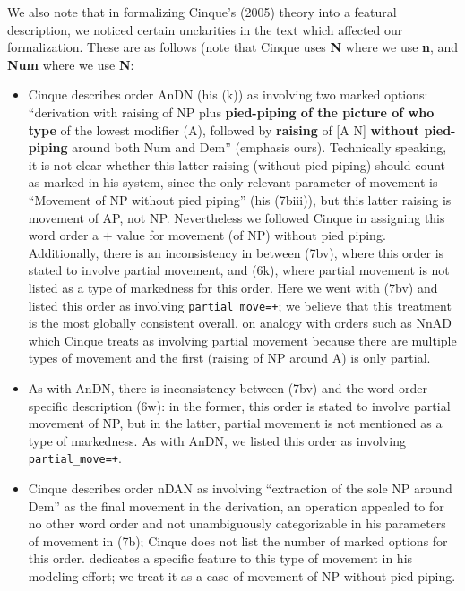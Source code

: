 \documentclass[11pt]{article}
\begin{document}
We also note that in formalizing Cinque's (2005) theory into a
featural description, we noticed certain unclarities in the text which
affected our formalization.  These are as follows (note that Cinque
uses \textbf{N} where we use \textbf{n}, and \textbf{Num} where we use
\textbf{N}:
%
\begin{itemize}
\item  Cinque describes order AnDN (his (k)) as involving two marked
  options: ``derivation with raising of NP plus \textbf{pied-piping of
    the picture of who type} of the lowest modifier (A), followed by
  \textbf{raising} of [A N] \textbf{without pied-piping} around both
  Num and Dem'' (emphasis ours).  Technically speaking, it is not
  clear whether this latter raising (without pied-piping) should count as marked
  in his system, since the only relevant parameter of movement 
   is ``Movement of NP without pied piping'' (his (7biii)), but this
   latter raising is movement of AP, not NP.  Nevertheless we followed
   Cinque in assigning this word order a $+$ value for movement
   (of NP) without pied piping.  Additionally, there is an
   inconsistency in \citet{cinque2005deriving} between (7bv), where
   this order is stated to involve partial movement, and (6k), where
   partial movement is not listed as a type of markedness for this
   order. Here we went with (7bv) and listed this order as involving
   \verb-partial_move=+-; we believe that this treatment is the most
   globally consistent overall, on analogy with orders such as NnAD
   which Cinque treats as involving partial movement because there are
   multiple types of movement and the first (raising of NP around A)
   is only partial.
 \item As with AnDN, there is inconsistency between (7bv) and the
   word-order-specific description (6w): in the  former, this order is
   stated to involve partial movement of NP, but in the latter,
   partial movement is not mentioned as a type of markedness.  As with AnDN,
   we listed this order as involving \verb-partial_move=+-.   %
 \item Cinque describes order nDAN as involving ``extraction of the
   sole NP around Dem'' as the final movement in the derivation, an
   operation appealed to for no other word order and not unambiguously
   categorizable in his parameters of movement in (7b); Cinque does
   not list the number of marked options for this order.
   \citet{cysouw2010towards} dedicates a specific feature to this type
   of movement in his modeling effort; we treat it as a case of
   movement of NP without pied piping.
\end{itemize}
\end{document}
